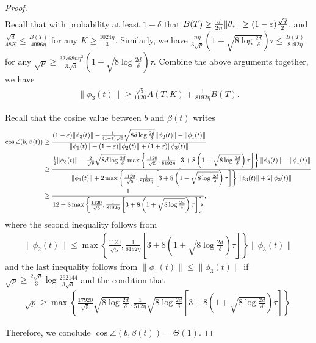 \begin{proof}
\begin{align*}
    \end{align*}
    Recall that with probability at least $1-\delta$ that $B(T) \geq \frac{d}{2n}\|\theta_*\| \geq (1-\varepsilon)\frac{\sqrt{d}}{2}$, and $\frac{\sqrt{d}}{48K} \leq \frac{B(T)}{4096\eta}$ for any $K \geq \frac{1024\eta}{3}$. Similarly, we have $\frac{n\eta}{3\sqrt{p}} \left(1 + \sqrt{8\log\frac{2d}{\delta}}\right) \tau \leq \frac{B(T)}{8192\eta}$ for any $\sqrt{p} \geq \frac{32768n\eta^2}{3\sqrt{d}}\left(1 + \sqrt{8\log\frac{2d}{\delta}}\right)\tau$.
    Combine the above arguments together, we have 
    \begin{align*}
        \|\phi_{3}(t)\| \geq \frac{\sqrt{5}}{1120} A(T,K) + \frac{1}{8192\eta} B(T).
    \end{align*}
    
    Recall that the cosine value between $b$ and $\beta(t)$ writes
    \begin{align*}
        \cos\angle(b, \beta(t)) & \geq \frac{(1-\varepsilon)\|\phi_{3}(t)\|-\frac{1}{(1-\varepsilon)\sqrt{p}} \sqrt{8d\log\frac{2d}{\delta}} \|\phi_{2}(t)\| - \|\phi_{1}(t)\|}{\|\phi_{1}(t)\|+(1+\varepsilon)\|\phi_{2}(t)\|+(1+\varepsilon)\|\phi_{3}(t)\|} \\
        & \geq \frac{\frac{1}{2}\|\phi_{3}(t)\|-\frac{2}{\sqrt{p}} \sqrt{8d\log\frac{2d}{\delta}} \max\left\{ \frac{1120}{\sqrt{5}}, \frac{1}{8192\eta} \left[ 3 + 8\left(1 + \sqrt{8\log\frac{2d}{\delta}}\right)\tau \right] \right\} \|\phi_{3}(t)\| - \|\phi_{1}(t)\|}{\|\phi_{1}(t)\|+2\max\left\{ \frac{1120}{\sqrt{5}}, \frac{1}{8192\eta} \left[ 3 + 8\left(1 + \sqrt{8\log\frac{2d}{\delta}}\right)\tau \right] \right\} \|\phi_{3}(t)\| + 2\|\phi_{3}(t)\|} \\
        & \geq \frac{1}{12 + 8 \max\left\{ \frac{1120}{\sqrt{5}}, \frac{1}{8192\eta} \left[ 3 + 8\left(1 + \sqrt{8\log\frac{2d}{\delta}}\right)\tau \right] \right\}},
    \end{align*}
    where the second inequality follows from 
    \begin{align*}
        \|\phi_{2}(t)\| \leq \max\left\{ \frac{1120}{\sqrt{5}}, \frac{1}{8192\eta} \left[ 3 + 8\left(1 + \sqrt{8\log\frac{2d}{\delta}}\right)\tau \right] \right\} \|\phi_{3}(t)\|
    \end{align*}
    and the last inequality follows from $\|\phi_{1}(t)\| \leq \|\phi_{3}(t)\|$ if $\sqrt{p} \geq \frac{2\sqrt{d}}{3}\log\frac{262144}{3\sqrt{d}}$ and the condition that
    \begin{align*}
        \sqrt{p} \geq \max\left\{ \frac{17920}{\sqrt{5}}\sqrt{8\log\frac{2d}{\delta}}, \frac{1}{512\eta} \sqrt{8\log\frac{2d}{\delta}} \left[ 3 + 8\left(1 + \sqrt{8\log\frac{2d}{\delta}}\right)\tau \right] \right\}.
    \end{align*}
    
    Therefore, we conclude $\cos\angle(b, \beta(t)) = \Theta(1)$.
\end{proof}

